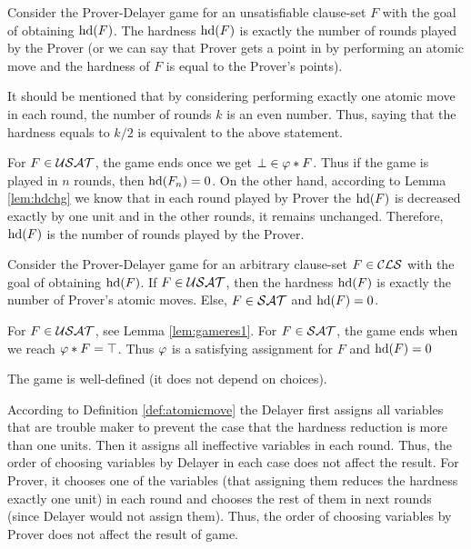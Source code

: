\documentclass{report}
\begin{document}
\begin{lem}\label{lem:gameres1}
Consider the Prover-Delayer game for an unsatisfiable clause-set $F$ with the goal of obtaining $\operatorname{hd}(F)$. The hardness $\operatorname{hd}(F)$ is exactly the number of rounds played by the Prover (or we can say that Prover gets a point in by performing an atomic move and the hardness of $F$ is equal to the Prover's points).

It should be mentioned that by considering performing exactly one atomic move in each round, the number of rounds $k$ is an even number. Thus, saying that the hardness equals to $k / 2$ is equivalent to the above statement.
\end{lem}
\begin{prf}
For $F \in \mathcal{USAT}$, the game ends once we get $\bot \in \varphi * F $. Thus if the game is played in $n$ rounds, then $\operatorname{hd}(F_n)=0$. On the other hand, according to Lemma \ref{lem:hdchg} we know that in each round played by Prover the $\operatorname{hd}(F)$ is decreased exactly by one unit and in the other rounds, it remains unchanged. Therefore, $\operatorname{hd}(F)$ is the number of rounds played by the Prover.
\end{prf}

\begin{lem}\label{lem:gameres2}
Consider the Prover-Delayer game for an arbitrary clause-set $F \in \mathcal{CLS}$ with the goal of obtaining $\operatorname{hd}(F)$. If $F \in \mathcal{USAT}$, then the hardness $\operatorname{hd}(F)$ is exactly the number of Prover's atomic moves. Else, $F \in \mathcal{SAT}$ and $\operatorname{hd}(F)=0$.
\end{lem}
\begin{prf}
For $F \in \mathcal{USAT}$, see Lemma \ref{lem:gameres1}. For $F \in \mathcal{SAT}$, the game ends when we reach $\varphi * F=\top$. Thus $\varphi$ is a satisfying assignment for $F$ and $\operatorname{hd}(F)=0$
\end{prf}

\begin{lem}\label{lem:game1}
The game is well-defined (it does not depend on choices).
\end{lem}
\begin{prf}
According to Definition \ref{def:atomicmove} the Delayer first assigns all variables that are trouble maker to prevent the case that the hardness reduction is more than one units. Then it assigns all ineffective variables in each round. Thus, the order of choosing variables by Delayer in each case does not affect the result. For Prover, it chooses one of the variables (that assigning them reduces the hardness exactly one unit) in each round and chooses the rest of them in next rounds (since Delayer would not assign them). Thus, the order of choosing variables by Prover does not affect the result of game.
\end{prf}
\end{document}
